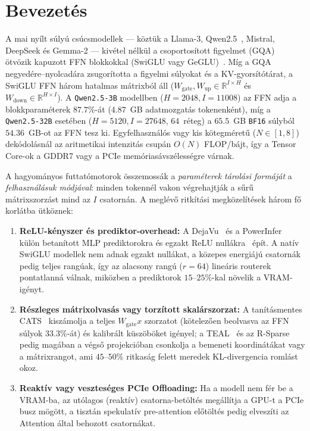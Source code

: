 \documentclass[10pt,twocolumn]{article}
\begin{document}
\section{Bevezetés}
A mai nyílt súlyú csúcsmodellek --- köztük a Llama-3, Qwen2.5~\cite{qwen25_2024}, Mistral, DeepSeek és Gemma-2 --- kivétel nélkül a csoportosított figyelmet (GQA)~\cite{ainslie2023gqa} ötvözik kapuzott FFN blokkokkal (SwiGLU vagy GeGLU)~\cite{shazeer2020glu}. Míg a GQA negyedére--nyolcadára zsugorította a figyelmi súlyokat és a KV-gyorsítótárat, a SwiGLU FFN három hatalmas mátrixból áll ($W_{\mathrm{gate}}, W_{\mathrm{up}} \in \mathbb{R}^{I\times H}$ és $W_{\mathrm{down}} \in \mathbb{R}^{H\times I}$). A \texttt{Qwen2.5-3B} modellben ($H=2048, I=11008$) az FFN adja a blokkparaméterek $87.7\%$-át ($4.87$~GB adatmozgatás tokenenként), míg a \texttt{Qwen2.5-32B} esetében ($H=5120, I=27648$, $64$~réteg) a $65.5$~GB \texttt{BF16} súlyból $54.36$~GB-ot az FFN tesz ki. Egyfelhasználós vagy kis kötegméretű ($N\in[1,8]$) dekódolásnál az aritmetikai intenzitás csupán $O(N)$ FLOP/bájt, így a Tensor Core-ok a GDDR7 vagy a PCIe memóriasávszélességre várnak.

A hagyományos futtatómotorok összemossák a \emph{paraméterek tárolási formáját} a \emph{felhasználásuk módjával}: minden tokennél vakon végrehajtják a sűrű mátrixszorzást mind az $I$ csatornán. A meglévő ritkítási megközelítések három fő korlátba ütköznek:
\begin{enumerate}
  \item \textbf{ReLU-kényszer és prediktor-overhead:} A DejaVu~\cite{liu2023dejavu} és a PowerInfer~\cite{song2024powerinfer} külön betanított MLP prediktorokra és egzakt ReLU nullákra~\cite{mirzadeh2024relustrikesback} épít. A natív SwiGLU modellek nem adnak egzakt nullákat, a közepes energiájú csatornák pedig teljes rangúak, így az alacsony rangú ($r=64$) lineáris routerek pontatlanná válnak, miközben a prediktorok $15\text{--}25\%$-kal növelik a VRAM-igényt.
  \item \textbf{Részleges mátrixolvasás vagy torzított skalárszorzat:} A tanításmentes CATS~\cite{lee2024cats} kiszámolja a teljes $W_{\mathrm{gate}} x$ szorzatot (kötelezően beolvasva az FFN súlyok $33.3\%$-át) és kalibrált küszöböket igényel; a TEAL~\cite{liu2025teal} és az R-Sparse~\cite{zhang2025rsparse} pedig magában a végső projekcióban csonkolja a bemeneti koordinátákat vagy a mátrixrangot, ami $45\text{--}50\%$ ritkaság felett meredek KL-divergencia romlást okoz.
  \item \textbf{Reaktív vagy veszteséges PCIe Offloading:} Ha a modell nem fér be a VRAM-ba, az utólagos (reaktív) csatorna-betöltés megállítja a GPU-t a PCIe busz mögött, a tisztán spekulatív pre-attention előtöltés pedig elveszíti az Attention által behozott csatornákat.
\end{enumerate}
\end{document}
